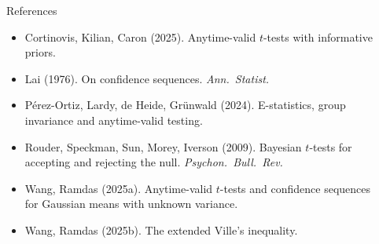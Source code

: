 \documentclass[final]{beamer}
\newlength{\sepwidth}
\newlength{\colwidth}
\newcommand{\separatorcolumn}{\begin{column}{\sepwidth}\end{column}}
\begin{document}
\begin{frame}[t]
\begin{columns}[t]
\begin{column}{\colwidth}
  \begin{block}{References}
    \footnotesize
    \begin{itemize}
      \setlength\itemsep{0.05cm}
      \item Cortinovis, Kilian, Caron (2025). Anytime-valid $t$-tests with informative priors.
      \item Lai (1976). On confidence sequences. \emph{Ann.\ Statist.}
      \item P\'erez-Ortiz, Lardy, de Heide, Gr\"unwald (2024). E-statistics, group invariance and anytime-valid testing.
      \item Rouder, Speckman, Sun, Morey, Iverson (2009). Bayesian $t$-tests for accepting and rejecting the null. \emph{Psychon.\ Bull.\ Rev.}
      \item Wang, Ramdas (2025a). Anytime-valid $t$-tests and confidence sequences for Gaussian means with unknown variance.
      \item Wang, Ramdas (2025b). The extended Ville's inequality.
    \end{itemize}
  \end{block}

\end{column}

\separatorcolumn
\end{columns}
\end{frame}
\end{document}
